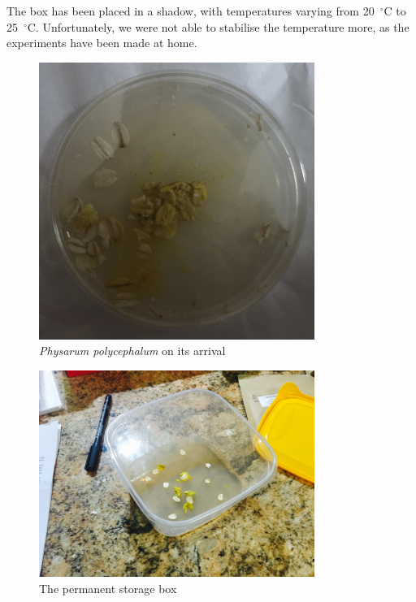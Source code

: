 The box has been placed in a shadow, with temperatures varying from 20~$^{\circ}$C to 25~$^{\circ}$C. Unfortunately, we were not able to stabilise the temperature more, as the experiments have been made at home.

\begin{figure}
  \centering

  \includegraphics[width=0.8\textwidth]{figures/physarum/IMG_1168_crop.jpg}

  \caption{\textit{Physarum polycephalum} on its arrival}
  \label{figure:p_initial_petri}
\end{figure}

\begin{figure}
  \centering

  \includegraphics[width=0.8\textwidth]{figures/physarum/IMG_1179.jpg}

  \caption{The permanent storage box}
  \label{figure:p_box}
\end{figure}

